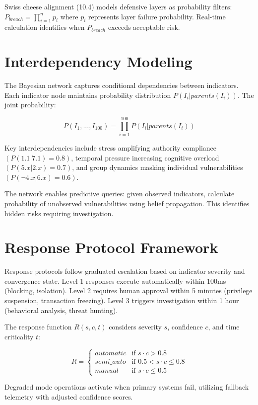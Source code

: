 \documentclass[10pt, twocolumn]{article}
\begin{document}
Swiss cheese alignment (10.4) models defensive layers as probability filters: $P_{breach} = \prod_{i=1}^{n} p_i$ where $p_i$ represents layer failure probability. Real-time calculation identifies when $P_{breach}$ exceeds acceptable risk.

\section{Interdependency Modeling}

The Bayesian network captures conditional dependencies between indicators. Each indicator node maintains probability distribution $P(I_i | parents(I_i))$. The joint probability:

$$P(I_1, ..., I_{100}) = \prod_{i=1}^{100} P(I_i | parents(I_i))$$

Key interdependencies include stress amplifying authority compliance $(P(1.1|7.1) = 0.8)$, temporal pressure increasing cognitive overload $(P(5.x|2.x) = 0.7)$, and group dynamics masking individual vulnerabilities $(P(\neg 4.x|6.x) = 0.6)$.

The network enables predictive queries: given observed indicators, calculate probability of unobserved vulnerabilities using belief propagation. This identifies hidden risks requiring investigation.

\section{Response Protocol Framework}

Response protocols follow graduated escalation based on indicator severity and convergence state. Level 1 responses execute automatically within 100ms (blocking, isolation). Level 2 requires human approval within 5 minutes (privilege suspension, transaction freezing). Level 3 triggers investigation within 1 hour (behavioral analysis, threat hunting).

The response function $R(s, c, t)$ considers severity $s$, confidence $c$, and time criticality $t$:

$$R = \begin{cases}
automatic & \text{if } s \cdot c > 0.8 \\
semi\_auto & \text{if } 0.5 < s \cdot c \leq 0.8 \\
manual & \text{if } s \cdot c \leq 0.5
\end{cases}$$

Degraded mode operations activate when primary systems fail, utilizing fallback telemetry with adjusted confidence scores.
\end{document}
